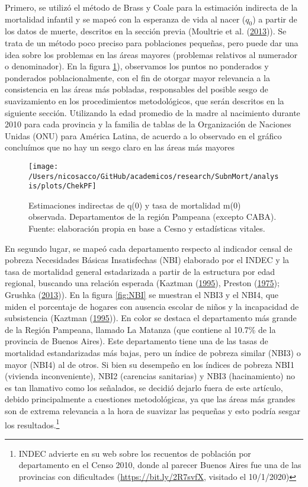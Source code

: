 \documentclass[12pt,]{article}
\begin{document}
Primero, se utilizó el método de Brass y Coale para la estimación
indirecta de la mortalidad infantil y se mapeó con la esperanza de vida
al nacer (\(q_0\)) a partir de los datos de muerte, descritos en la
sección previa (Moultrie et al.
(\protect\hyperlink{ref-Moultrie}{2013})). Se trata de un método poco
preciso para poblaciones pequeñas, pero puede dar una idea sobre los
problemas en las áreas mayores (problemas relativos al numerador o
denominador). En la figura \ref{fig:PF}), observamos los puntos no
ponderados y ponderados poblacionalmente, con el fin de otorgar mayor
relevancia a la consistencia en las áreas más pobladas, responsables del
posible sesgo de suavizamiento en los procedimientos metodológicos, que
serán descritos en la siguiente sección. Utilizando la edad promedio de
la madre al nacimiento durante 2010 para cada provincia y la familia de
tablas de la Organización de Naciones Unidas (ONU) para América Latina,
de acuerdo a lo observado en el gráfico concluímos que no hay un sesgo
claro en las áreas más mayores

\begin{figure}

{\centering \texttt{[image: /Users/nicosacco/GitHub/academicos/research/SubnMort/analysis/plots/ChekPF]} 

}

\caption{Estimaciones indirectas de q(0) y tasa de mortalidad m(0) observada. Departamentos de la región Pampeana (excepto CABA). Fuente: elaboración propia en base a Cesno y estadísticas vitales.}\label{fig:PF}
\end{figure}

En segundo lugar, se mapeó cada departamento respecto al indicador
censal de pobreza Necesidades Básicas Insatisfechas (NBI) elaborado por
el INDEC y la tasa de mortalidad general estadarizada a partir de la
estructura por edad regional, buscando una relación esperada (Kaztman
(\protect\hyperlink{ref-Kaztman1995}{1995}), Preston
(\protect\hyperlink{ref-Preston_1975}{1975}); Grushka
(\protect\hyperlink{ref-Grushka2013}{2013})). En la figura \ref{fig:NBI}
se muestran el NBI3 y el NBI4, que miden el porcentaje de hogares con
ausencia escolar de niños y la incapacidad de subsistencia (Kaztman
(\protect\hyperlink{ref-Kaztman1995}{1995})). En color se destaca el
departamento más grande de la Región Pampeana, llamado La Matanza (que
contiene al 10.7\% de la provincia de Buenos Aires). Este departamento
tiene una de las tasas de mortalidad estandarizadas más bajas, pero un
índice de pobreza similar (NBI3) o mayor (NBI4) al de otros. Si bien su
desempeño en los índices de pobreza NBI1 (vivienda inconveniente), NBI2
(carencias sanitarias) y NBI3 (hacinamiento) no es tan llamativo como
los señalados, se decidió dejarlo fuera de este artículo, debido
principalmente a cuestiones metodológicas, ya que las áreas más grandes
son de extrema relevancia a la hora de suavizar las pequeñas y esto
podría sesgar los resultados.\footnote{INDEC advierte en su web sobre
  los recuentos de población por departamento en el Censo 2010, donde al
  parecer Buenos Aires fue una de las provincias con dificultades
  (\url{https://bit.ly/2R7svfX}, visitado el 10/1/2020)}
\end{document}
